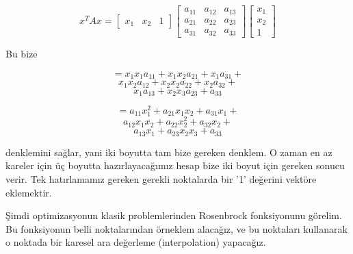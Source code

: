 \documentclass[12pt,fleqn]{article}\usepackage{../../common}
\begin{document}
$$
x^T A x =
\left[\begin{array}{ccc}
x_1 & x_2 & 1
\end{array}\right]
\left[\begin{array}{ccc}
a_{11} & a_{12} & a_{13} \\
a_{21} & a_{22} & a_{23} \\
a_{31} & a_{32} & a_{33} 
\end{array}\right]
\left[\begin{array}{c}
x_1 \\ x_2 \\ 1
\end{array}\right]
$$

Bu bize 

$$
= x_1 x_1 a_{11} + x_1 x_2 a_{21} + x_1 a_{31} +
$$
$$
x_1 x_2 a_{12} + x_2 x_2 a_{22} + x_2 a_{32} +  
$$
$$
x_1 a_{13} + x_2 x_3 a_{23} +  a_{33} 
$$

$$
=  a_{11} x_1^2 + a_{21} x_1 x_2  + a_{31}x_1  +
$$
$$
a_{12}x_1 x_2  + a_{22}x_2^2 +  a_{32} x_2+  
$$
$$
a_{13} x_1  + a_{23} x_2 x_3 +  a_{33} 
$$

denklemini sağlar, yani iki boyutta tam bize gereken denklem. O zaman en az
kareler için üç boyutta hazırlayacağımız hesap bize iki boyut için gereken
sonucu verir. Tek hatırlamamız gereken gerekli noktalarda bir '1' değerini
vektöre eklemektir.

Şimdi optimizasyonun klasik problemlerinden Rosenbrock fonksiyonunu
görelim. Bu fonksiyonun belli noktalarından örneklem alacağız, ve bu
noktaları kullanarak o noktada bir karesel ara değerleme (interpolation)
yapacağız.
\end{document}
